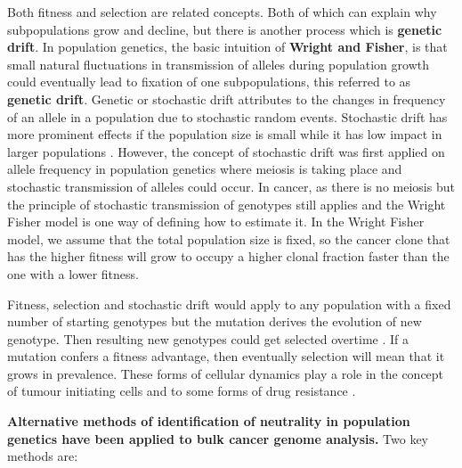 Both fitness and selection are related concepts. Both of which can explain why subpopulations grow and decline, but there is another process which is \textbf{genetic drift}. In population genetics, the basic intuition of \textbf{Wright and Fisher}, is that small natural fluctuations in transmission of alleles during population growth could eventually lead to fixation of one subpopulations, this referred to as \textbf{genetic  drift}. Genetic or stochastic drift attributes to the changes in frequency of an allele in a population due to stochastic random events. Stochastic drift has more prominent effects if the population size is small while it has low impact in larger populations \cite{lynch2007origins}. However, the concept of stochastic drift was first applied on allele frequency in population genetics where meiosis is taking place and stochastic transmission of alleles could occur. In cancer, as there is no meiosis but the principle of stochastic transmission of genotypes still applies and the Wright Fisher model is one way of defining how to estimate it. In the Wright Fisher model, we assume that the total population size is fixed, so the cancer clone that has the higher fitness will grow to occupy a higher clonal fraction faster than the one with a lower fitness.


Fitness, selection and stochastic drift would apply to any population with a fixed number of starting genotypes but the mutation derives the evolution of new genotype. Then resulting new genotypes could get selected overtime \cite{jain2007deterministic,gerrish1998fate}. If a mutation confers a fitness advantage, then eventually selection will mean that it grows in prevalence.
These forms of cellular dynamics play a role in the concept of tumour initiating cells \cite{magee2012cancer} and to some forms of drug resistance \cite{shaffer2017rare, kreso2013variable}. 



\textbf{Alternative methods of identification of neutrality in population genetics have been applied to bulk cancer genome analysis.} 
Two key methods are:

